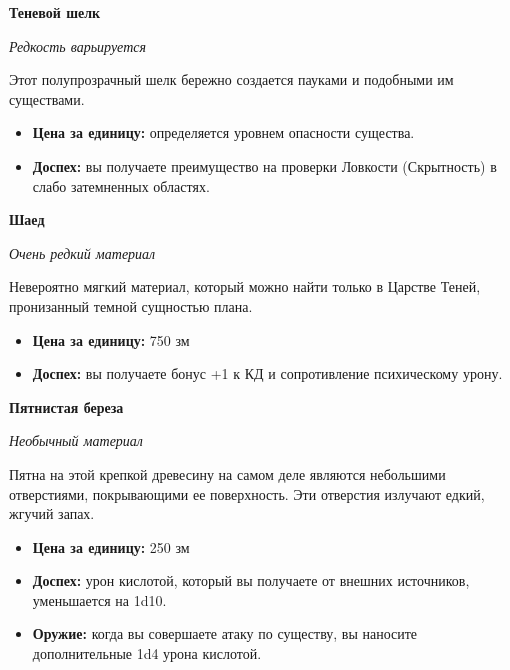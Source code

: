 \documentclass[a4paper, 9pt, twocolumn]{book}
\begin{document}
	\noindent \textbf{Теневой шелк}
	
	\noindent \textit{Редкость варьируется}
	
	\smallskip
	
	\noindent Этот полупрозрачный шелк бережно создается пауками и подобными им существами.
	
	\begin{itemize}
		\item \textbf{Цена за единицу:} определяется уровнем опасности существа.
		
		\item \textbf{Доспех:} вы получаете преимущество на проверки Ловкости (Скрытность) в слабо затемненных областях.
	\end{itemize}

	\noindent \textbf{Шаед}
	
	\noindent \textit{Очень редкий материал}
	
	\smallskip
	
	\noindent Невероятно мягкий материал, который можно найти только в Царстве Теней, пронизанный темной сущностью плана.
	
	\begin{itemize}
		\item \textbf{Цена за единицу:} 750 зм
		
		\item \textbf{Доспех:} вы получаете бонус +1 к КД и сопротивление психическому урону.
	\end{itemize}

	\noindent \textbf{Пятнистая береза}
	
	\noindent \textit{Необычный материал}
	
	\smallskip
	
	\noindent Пятна на этой крепкой древесину на самом деле являются небольшими отверстиями, покрывающими ее поверхность. Эти отверстия излучают едкий, жгучий запах.
	
	\begin{itemize}
		\item \textbf{Цена за единицу:} 250 зм
		
		\item \textbf{Доспех:} урон кислотой, который вы получаете от внешних источников, уменьшается на 1d10.
		
		\item \textbf{Оружие:} когда вы совершаете атаку по существу, вы наносите дополнительные 1d4 урона кислотой.
	\end{itemize}
\end{document}
